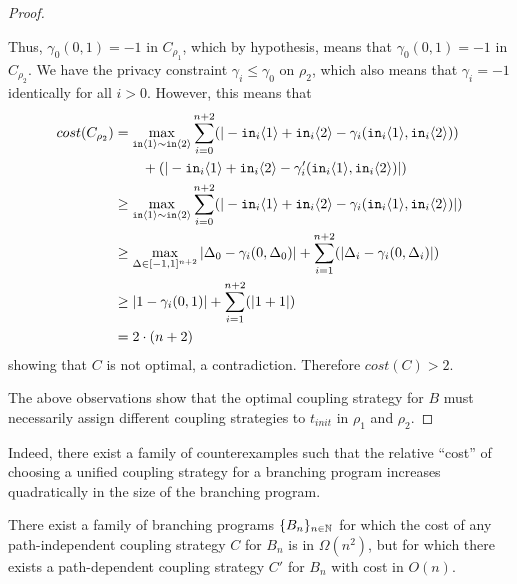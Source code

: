 \begin{proof}
\begin{itemize}
    Thus, $\gamma_0(0, 1) = -1$ in $C_{\rho_1}$, which by hypothesis, means that $\gamma_0(0, 1) = -1$ in $C_{\rho_2}$. We have the privacy constraint $\gamma_i \leq \gamma_0$ on $\rho_2$, which also means that $\gamma_i = -1$ identically for all $i > 0$. However, this means that 
    \begin{align*}
        cost(C_{\rho_2}) &= \max_{\texttt{in}\langle1 \rangle\sim\texttt{in}\langle2 \rangle}\sum_{i=0}^{n+2}(|-\texttt{in}_i\langle1 \rangle+\texttt{in}_i\langle2 \rangle-\gamma_i(\texttt{in}_i\langle1 \rangle, \texttt{in}_i\langle2 \rangle))\\&\qquad+(|-\texttt{in}_i\langle1 \rangle+\texttt{in}_i\langle2 \rangle-\gamma_i'(\texttt{in}_i\langle1 \rangle, \texttt{in}_i\langle2 \rangle)|)\\
        &\geq \max_{\texttt{in}\langle1 \rangle\sim\texttt{in}\langle2 \rangle} \sum_{i=0}^{n+2}(|-\texttt{in}_i\langle1 \rangle+\texttt{in}_i\langle2 \rangle-\gamma_i(\texttt{in}_i\langle1 \rangle, \texttt{in}_i\langle2 \rangle)|)\\
        &\geq \max_{\Delta \in [-1, 1]^{n+2}} |\Delta_0 - \gamma_i(0, \Delta_0)| + \sum_{i=1}^{n+2}(|\Delta_i-\gamma_i(0, \Delta_i)|)\\
        &\geq |1 - \gamma_i(0, 1)| + \sum_{i=1}^{n+2}(|1+1|)\\
        &= 2 \cdot (n + 2)
    \end{align*}
    showing that $C$ is not optimal, a contradiction. Therefore $cost(C) > 2$.

    \end{itemize}
    
    The above observations show that the optimal coupling strategy for $B$ must necessarily assign different coupling strategies to $t_{init}$ in $\rho_1$ and $\rho_2$.
\end{proof}

Indeed, there exist a family of counterexamples such that the relative ``cost'' of choosing a unified coupling strategy for a branching program increases quadratically in the size of the branching program.


\begin{prop}
    There exist a family of branching programs $\{B_n\}_{n\in \mathbb{N}}$ for which the cost of any path-independent coupling strategy $C$ for $B_n$ is in $\Omega(n^2)$, but for which there exists a path-dependent coupling strategy $C'$ for $B_n$ with cost in $O(n)$.
\end{prop}

